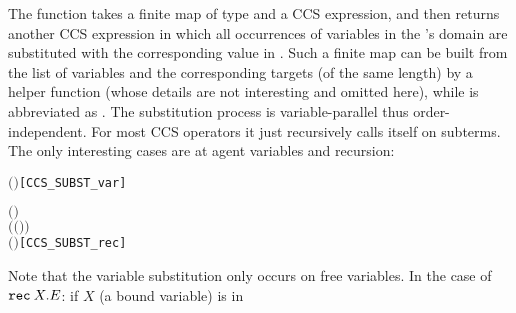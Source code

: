 The function  takes a finite
map  of type  and a CCS expression,
and then returns another CCS expression in which
all occurrences of variables in the 's domain are substituted with
the corresponding value in . Such a finite map can be built from
the list of variables  and the corresponding targets
 (of the same length) by a helper function  (whose details are
not interesting and omitted here), while
 is
abbreviated as .
The substitution process is
variable-parallel thus order-independent. For most CCS operators it
just recursively calls itself on subterms. The only
interesting cases are at agent variables and recursion:
\begin{alltt}
     \ensuremath{(} \ensuremath{)} \HOLTokenDefEquality{}   \HOLSymConst{\HOLTokenIn{}}         \hfill{[CCS_SUBST_var]}

     \ensuremath{(}  \ensuremath{)} \HOLTokenDefEquality{}
       \HOLSymConst{\HOLTokenIn{}}      \ensuremath{(} \ensuremath{(} \HOLSymConst{\ensuremath{\setminus}} \ensuremath{)} \ensuremath{)}
        \ensuremath{(}  \ensuremath{)}\hfill{[CCS_SUBST_rec]}
\end{alltt}
Note that the variable substitution only occurs on free
variables. In the case of ${\tt rec}\: X . E$: if $X$ (a bound variable) is in
